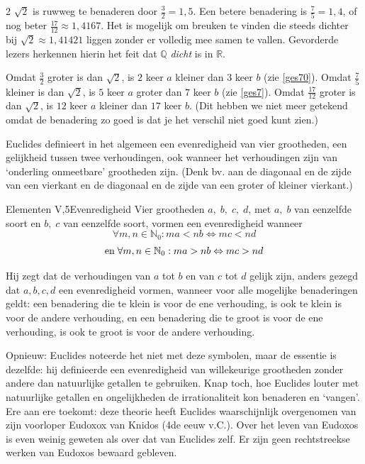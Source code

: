 \begin{multicols}{2}
	$\sqrt{2}$ is ruwweg te benaderen door $\frac{3}{2}=1,5$. Een betere benadering is $\frac{7}{5}=1,4$, of nog beter $\frac{17}{12}\approx 1,4167$. Het is mogelijk om breuken te vinden die steeds dichter bij $\sqrt{2}\approx 1,41421$ liggen zonder er volledig mee samen te vallen. Gevorderde lezers herkennen hierin het feit dat $\mathbb{Q}$ \emph{dicht} is in $\mathbb{R}$.
	
	Omdat $\frac{3}{2}$ groter is dan $\sqrt{2}$, is $2$ keer $a$ kleiner dan $3$ keer $b$ (zie \autoref{ges70}). Omdat $\frac{7}{5}$ kleiner is dan $\sqrt{2}$, is $5$ keer $a$ groter dan $7$ keer $b$
	(zie \autoref{ges7}). Omdat $\frac{17}{12}$ groter is dan $\sqrt{2}$, is $12$ keer $a$ kleiner dan $17$ keer $b$. (Dit hebben we niet meer getekend omdat de benadering zo goed is dat je het verschil niet goed kunt zien.)
	
 
	
	Euclides definieert in het algemeen een evenredigheid van vier grootheden, een gelijkheid tussen twee verhoudingen, ook wanneer het verhoudingen zijn van `onderling onmeetbare' grootheden zijn. (Denk bv. aan de diagonaal en de zijde van een vierkant en de diagonaal en de zijde van een groter of kleiner vierkant.)

 \begin{kader}{Elementen V,5}{Evenredigheid}
		Vier grootheden $a,\; b,\; c,\; d$, met $a,\; b$ van eenzelfde soort en $b,\;c$ van eenzelfde soort, vormen een evenredigheid wanneer
		$$\forall m, n\in\mathbb{N}_0: m a < n b \Leftrightarrow m c < n d$$
		$$\text{en\;} \forall m, n\in\mathbb{N}_0: m a > n b \Leftrightarrow m c > n d$$
	\end{kader}
	
	Hij zegt dat de verhoudingen van $a$ tot $b$ en van $c$ tot $d$ gelijk zijn, anders gezegd dat $a, b, c, d$ een evenredigheid vormen, wanneer voor alle mogelijke benaderingen geldt: een benadering die te klein is voor de ene verhouding, is ook te klein is voor de andere verhouding, en een benadering die te groot is voor de ene verhouding, is ook te groot is voor de andere verhouding.
	
	
	Opnieuw: Euclides noteerde het niet met deze symbolen, maar de essentie is dezelfde: hij definieerde een evenredigheid van willekeurige grootheden zonder andere dan natuurlijke getallen te gebruiken. Knap toch, hoe Euclides louter met natuurlijke getallen en ongelijkheden de irrationaliteit kon benaderen en `vangen'. Ere aan ere toekomt: deze theorie heeft Euclides waarschijnlijk overgenomen van zijn voorloper Eudoxox van Knidos (4de eeuw v.C.). Over het leven van Eudoxos is even weinig geweten als over dat van Euclides zelf. Er zijn geen rechtstreekse werken van Eudoxos bewaard gebleven.
	

\end{multicols}
